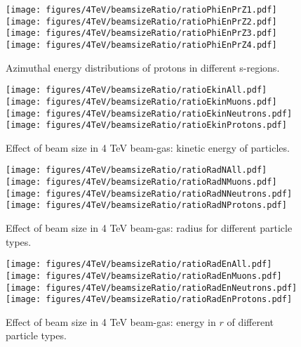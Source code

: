 \begin{figure}%
\begin{center}
  \texttt{[image: figures/4TeV/beamsizeRatio/ratioPhiEnPrZ1.pdf]}
  \texttt{[image: figures/4TeV/beamsizeRatio/ratioPhiEnPrZ2.pdf]}
  \texttt{[image: figures/4TeV/beamsizeRatio/ratioPhiEnPrZ3.pdf]}
  \texttt{[image: figures/4TeV/beamsizeRatio/ratioPhiEnPrZ4.pdf]}
\end{center}
\vspace{-0.6cm}
 \caption{Azimuthal energy distributions of protons in different s-regions.
  \label{bsZPr}}
\end{figure}

\begin{figure}%
\begin{center}
  \texttt{[image: figures/4TeV/beamsizeRatio/ratioEkinAll.pdf]}
  \texttt{[image: figures/4TeV/beamsizeRatio/ratioEkinMuons.pdf]}
  \texttt{[image: figures/4TeV/beamsizeRatio/ratioEkinNeutrons.pdf]}
  \texttt{[image: figures/4TeV/beamsizeRatio/ratioEkinProtons.pdf]}
\end{center}
\vspace{-0.6cm}
 \caption{Effect of beam size in 4 TeV beam-gas: kinetic energy of particles.
  \label{bsRatioEkin}}
\end{figure}

\begin{figure}%
\begin{center}
  \texttt{[image: figures/4TeV/beamsizeRatio/ratioRadNAll.pdf]}
  \texttt{[image: figures/4TeV/beamsizeRatio/ratioRadNMuons.pdf]}
  \texttt{[image: figures/4TeV/beamsizeRatio/ratioRadNNeutrons.pdf]}
  \texttt{[image: figures/4TeV/beamsizeRatio/ratioRadNProtons.pdf]}
\end{center}
\vspace{-0.6cm}
 \caption{Effect of beam size in 4 TeV beam-gas: radius for different particle types.
  \label{bsRatioRadN}}
\end{figure}

\begin{figure}%
\begin{center}
  \texttt{[image: figures/4TeV/beamsizeRatio/ratioRadEnAll.pdf]}
  \texttt{[image: figures/4TeV/beamsizeRatio/ratioRadEnMuons.pdf]}
  \texttt{[image: figures/4TeV/beamsizeRatio/ratioRadEnNeutrons.pdf]}
  \texttt{[image: figures/4TeV/beamsizeRatio/ratioRadEnProtons.pdf]}
\end{center}
\vspace{-0.6cm}
 \caption{Effect of beam size in 4 TeV beam-gas: energy in $r$ of different particle types.
  \label{bsRatioRadEn}}
\end{figure}


